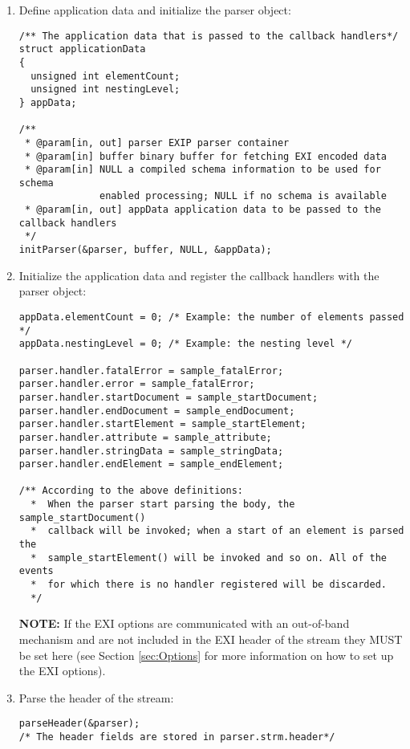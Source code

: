 \begin{enumerate}
 \item Define application data and initialize the parser object:
\begin{lstlisting}
/** The application data that is passed to the callback handlers*/
struct applicationData
{
  unsigned int elementCount;
  unsigned int nestingLevel;
} appData;

/**
 * @param[in, out] parser EXIP parser container
 * @param[in] buffer binary buffer for fetching EXI encoded data
 * @param[in] NULL a compiled schema information to be used for schema
		      enabled processing; NULL if no schema is available
 * @param[in, out] appData application data to be passed to the callback handlers
 */  
initParser(&parser, buffer, NULL, &appData);    
\end{lstlisting}

 \item Initialize the application data and register the callback handlers with the parser object:
\begin{lstlisting}
appData.elementCount = 0; /* Example: the number of elements passed */
appData.nestingLevel = 0; /* Example: the nesting level */

parser.handler.fatalError = sample_fatalError;
parser.handler.error = sample_fatalError;
parser.handler.startDocument = sample_startDocument;
parser.handler.endDocument = sample_endDocument;
parser.handler.startElement = sample_startElement;
parser.handler.attribute = sample_attribute;
parser.handler.stringData = sample_stringData;
parser.handler.endElement = sample_endElement;

/** According to the above definitions:
  *  When the parser start parsing the body, the sample_startDocument()
  *  callback will be invoked; when a start of an element is parsed the
  *  sample_startElement() will be invoked and so on. All of the events
  *  for which there is no handler registered will be discarded. 
  */
\end{lstlisting}

\textbf{NOTE:} If the EXI options are communicated with an out-of-band mechanism and are
not included in the EXI header of the stream they MUST be set here
(see Section \ref{sec:Options} for more information on how to set up
the EXI options).

 \item Parse the header of the stream:
\begin{lstlisting}
parseHeader(&parser);
/* The header fields are stored in parser.strm.header*/
\end{lstlisting}


\end{enumerate}
